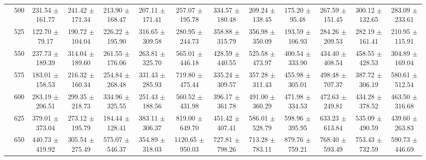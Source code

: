 \begin{table}[h]
{\begin{tabular}{
        ccccccccccccc}
 & 500& 231.54 $\pm$ 161.77& 241.42 $\pm$ 171.34& 213.90 $\pm$ 168.47& 207.11 $\pm$ 171.41& 257.07 $\pm$ 195.78& 334.57 $\pm$ 180.48& 209.24 $\pm$ 138.45& 175.20 $\pm$ 95.48& 267.59 $\pm$ 151.45& 300.12 $\pm$ 132.65& 283.09 $\pm$ 233.61 \\ 
 & 525& 122.70 $\pm$ 79.17& 190.72 $\pm$ 104.04& 226.22 $\pm$ 195.90& 316.65 $\pm$ 309.58& 280.95 $\pm$ 244.73& 358.88 $\pm$ 315.79& 356.98 $\pm$ 350.09& 193.59 $\pm$ 106.93& 284.26 $\pm$ 209.53& 282.19 $\pm$ 161.41& 210.95 $\pm$ 115.91 \\ 
 & 550& 237.73 $\pm$ 189.39& 314.04 $\pm$ 189.60& 261.55 $\pm$ 176.06& 263.81 $\pm$ 325.70& 565.01 $\pm$ 446.18& 428.59 $\pm$ 440.55& 525.58 $\pm$ 473.97& 400.54 $\pm$ 333.90& 434.40 $\pm$ 408.54& 458.55 $\pm$ 428.53& 304.89 $\pm$ 169.04 \\ 
 & 575& 183.01 $\pm$ 158.53& 216.32 $\pm$ 160.34& 254.84 $\pm$ 268.48& 331.43 $\pm$ 285.93& 719.80 $\pm$ 475.44& 335.24 $\pm$ 309.57& 357.28 $\pm$ 311.43& 455.98 $\pm$ 305.01& 498.48 $\pm$ 707.37& 387.72 $\pm$ 306.19& 580.61 $\pm$ 512.54 \\ 
 & 600& 283.19 $\pm$ 206.51& 299.35 $\pm$ 218.73& 334.96 $\pm$ 325.55& 251.43 $\pm$ 188.56& 560.52 $\pm$ 431.98& 396.17 $\pm$ 361.78& 491.00 $\pm$ 360.29& 471.98 $\pm$ 334.53& 472.63 $\pm$ 249.81& 434.28 $\pm$ 378.52& 463.50 $\pm$ 316.68 \\ 
 & 625& 379.01 $\pm$ 373.04& 273.12 $\pm$ 195.79& 184.44 $\pm$ 128.41& 383.11 $\pm$ 306.37& 819.00 $\pm$ 649.70& 451.42 $\pm$ 407.41& 586.01 $\pm$ 528.79& 598.96 $\pm$ 395.95& 633.23 $\pm$ 613.84& 535.09 $\pm$ 490.59& 439.60 $\pm$ 263.83 \\ 
 & 650& 440.73 $\pm$ 419.92& 305.54 $\pm$ 275.49& 575.07 $\pm$ 546.37& 354.89 $\pm$ 318.03& 1120.65 $\pm$ 950.03& 727.81 $\pm$ 798.26& 713.28 $\pm$ 783.11& 879.76 $\pm$ 759.21& 768.40 $\pm$ 593.49& 753.43 $\pm$ 732.59& 590.73 $\pm$ 446.69 \\ \hline 

        \end{tabular}%
        }

        \end{table}
        
